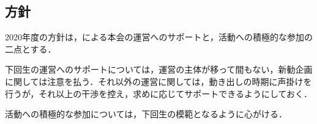 \subsection*{\newGradeIfKouki{}\thirdGrade{}方針}




2020年度の\newGradeIfKouki{}\thirdGrade{}方針は，\newGradeIfKouki{}\secondGrade{}による本会の運営へのサポートと，活動への積極的な参加の二点とする．

下回生の運営へのサポートについては，運営の主体が移って間もない，新勧企画に関しては注意を払う．それ以外の運営に関しては，動き出しの時期に声掛けを行うが，それ以上の干渉を控え，求めに応じてサポートできるようにしておく．

活動への積極的な参加については，下回生の模範となるように心がける．
